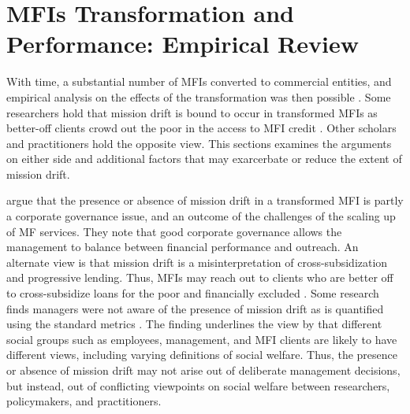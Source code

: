 \documentclass[a4paper,nobind]{templates/ociamthesis}
\begin{document}
\hypertarget{mfis-transformation-and-performance-empirical-review}{%
\section{MFIs Transformation and Performance: Empirical Review}\label{mfis-transformation-and-performance-empirical-review}}

\noindent With time, a substantial number of MFIs converted to commercial entities, and empirical analysis on the effects of the transformation was then possible \autocite{abeysekera2014sustainability,mia2017mission,d2017ngos}. Some researchers hold that mission drift is bound to occur in transformed MFIs as better-off clients crowd out the poor in the access to MFI credit \autocite{hishigsuren2006transformation}. Other scholars and practitioners hold the opposite view. This sections examines the arguments on either side and additional factors that may exarcerbate or reduce the extent of mission drift.

\textcite{campion1999institutional} argue that the presence or absence of mission drift in a transformed MFI is partly a corporate governance issue, and an outcome of the challenges of the scaling up of MF services. They note that good corporate governance allows the management to balance between financial performance and outreach. An alternate view is that mission drift is a misinterpretation of cross-subsidization and progressive lending. Thus, MFIs may reach out to clients who are better off to cross-subsidize loans for the poor and financially excluded \autocite{abeysekera2014sustainability}. Some research finds managers were not aware of the presence of mission drift as is quantified using the standard metrics \autocite{hishigsuren2007evaluating}. The finding underlines the view by \autocite{marti2016financial} that different social groups such as employees, management, and MFI clients are likely to have different views, including varying definitions of social welfare. Thus, the presence or absence of mission drift may not arise out of deliberate management decisions, but instead, out of conflicting viewpoints on social welfare between researchers, policymakers, and practitioners.
\end{document}
